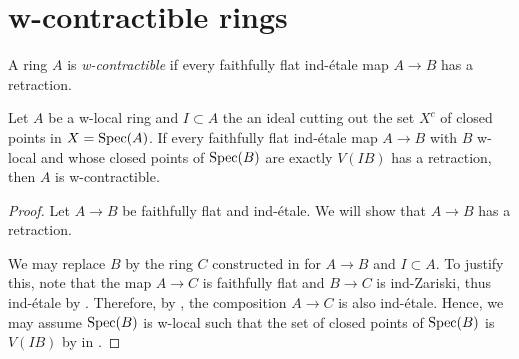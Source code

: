 \section{w-contractible rings}

\begin{definition}
A ring \(A\) is \emph{w-contractible} if every faithfully flat ind-étale map \(A \to B\) has a retraction.
  \label{def:w-contractible-ring}
\end{definition}

\begin{lemma}
  \label{thm:w-contractible-if-ind-etale-plus-c-has-retraction}
  Let \(A\) be a w-local ring and $I \subset A$ the an ideal cutting out the set $X^c$ of closed points in $X = \operatorname{Spec} (A)$. If every faithfully flat ind-étale map \(A \to B\) with \(B\) w-local and whose closed points of \(\operatorname{Spec} (B)\) are exactly \(V(IB)\) has a retraction, then \(A\) is w-contractible.
\end{lemma}

\begin{proof}
  Let $A \to B$ be faithfully flat and ind-étale. 
  We will show that $A \to B$ has a retraction.

  We may replace $B$ by the ring $C$ constructed in  for $A \to B$ and $I \subset A$. To justify this, note that the map \(A \to C\) is faithfully flat and \(B \to C\) is ind-Zariski, thus ind-étale by . Therefore, by , the composition \( A \to C \) is also ind-étale. Hence, we may assume $\operatorname{Spec} (B)$ is w-local such that the set of closed points of $\operatorname{Spec} (B)$ is $V(IB)$ by  in .
\end{proof}

